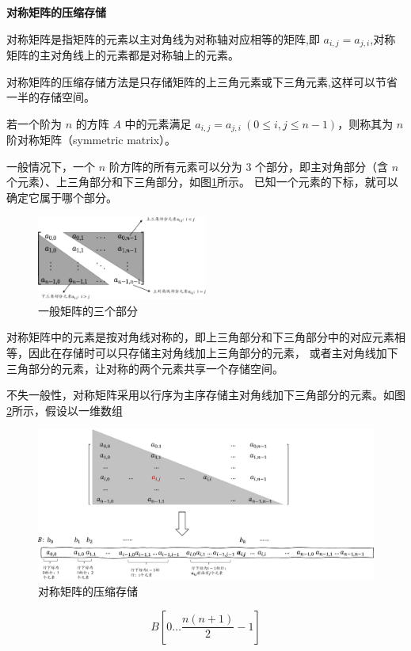 \documentclass[lang=cn,newtx,10pt,scheme=chinese]{elegantbook}
\begin{document}
\textbf{对称矩阵的压缩存储}

对称矩阵是指矩阵的元素以主对角线为对称轴对应相等的矩阵,即 $a_{i,j} = a_{j,i}$,对称矩阵的主对角线上的元素都是对称轴上的元素。

对称矩阵的压缩存储方法是只存储矩阵的上三角元素或下三角元素,这样可以节省一半的存储空间。


若一个阶为 $n$ 的方阵 $A$ 中的元素满足 $a_{i,j} = a_{j,i} \ (0 \leq i, j \leq n-1)$，则称其为 $n$ 阶对称矩阵（symmetric matrix）。

一般情况下，一个 $n$ 阶方阵的所有元素可以分为 3 个部分，即主对角部分（含 $n$ 个元素）、上三角部分和下三角部分，如图\ref{fig:common_matrix}所示。
已知一个元素的下标，就可以确定它属于哪个部分。

\begin{figure}[h]
  \centering
  \includegraphics[width=0.5\textwidth]{./figure/pdf/cropped/commonMatrix.pdf}
  \caption{一般矩阵的三个部分}
  \label{fig:common_matrix}
\end{figure}

对称矩阵中的元素是按对角线对称的，即上三角部分和下三角部分中的对应元素相等，因此在存储时可以只存储主对角线加上三角部分的元素，
或者主对角线加下三角部分的元素，让对称的两个元素共享一个存储空间。

不失一般性，对称矩阵采用以行序为主序存储主对角线加下三角部分的元素。如图\ref{fig:downMatrix}所示，假设以一维数组

\begin{figure}
  \centering
  \includegraphics[width=1\textwidth]{./figure/pdf/cropped/downMatrix.pdf}
  \caption{对称矩阵的压缩存储}
  \label{fig:downMatrix}
\end{figure}
\[
B[0 \dots \frac{n(n+1)}{2} - 1]
\]
\end{document}
